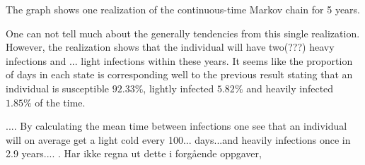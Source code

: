 The graph shows one realization of the continuous-time Markov chain for 5 years.

One can not tell much about the generally tendencies from this single realization. However, the realization shows that the individual will have two(???) heavy infections and ... light infections within these years. It seems like the proportion of days in each state is corresponding well to the previous result stating that an individual is susceptible $92.33\%$, lightly infected $5.82\%$ and heavily infected $1.85\%$ of the time. 

.... By calculating the mean time between infections one see that an individual will on average get a light cold every 100... days...and heavily infections once in 2.9 years.... . Har ikke regna ut dette i forgående oppgaver, 

